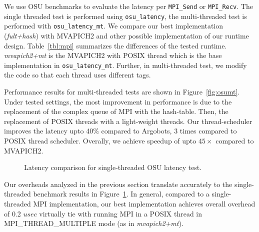 We use OSU benchmarks \cite{osubench} to evaluate the latency per
\texttt{MPI_Send} or \texttt{MPI_Recv}. The single threaded test is performed
using \texttt{osu_latency}, the multi-threaded test is performed with
\texttt{osu_latency_mt}. We compare our best implementation
(\textit{fult+hash}) with MVAPICH2 and other possible implementation of our
runtime design.  Table~\ref{tbl:mpi} summarizes the differences of the tested
runtime.  \textit{mvapich2+mt} is the MVAPICH2 with POSIX thread which is the
base implementation in \texttt{osu_latency_mt}. Further, in multi-threaded test,
we modify the code so that each thread uses different tags.

Performance results for multi-threaded tests are shown in
Figure~\ref{fig:osumt}.  Under tested settings, the most improvement in
performance is due to the replacement of the complex queue of MPI with the
hash-table.  Then, the replacement of POSIX threads with a light-weight
threads. Our thread-scheduler improves the latency upto 40\% compared to
Argobots, $3$ times compared to POSIX thread scheduler. Overally, we achieve
speedup of upto $45\times$ compared to MVAPICH2.

\begin{figure}
  \centering
  \caption{Latency comparison for single-threaded OSU latency test.\label{fig:osu-single}}
\end{figure}

Our overheads analyzed in the previous section translate accurately to the
single-threaded benchmark results in Figure~\ref{fig:osu-single}. In general,
compared to a single-threaded MPI implementation, our best implementation
achieves overall overhead of 0.2 $usec$ virtually tie with running MPI
in a POSIX thread in MPI_THREAD_MULTIPLE mode (as in \textit{mvapich2+mt}).
